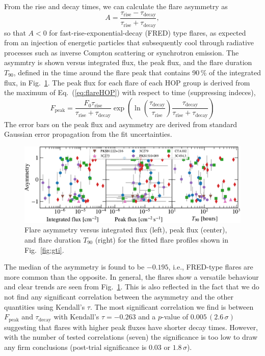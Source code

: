 \documentclass[twocolumn]{aastex62}
\begin{document}
From the rise and decay times, we can calculate the flare asymmetry as
\begin{equation}
    A = \frac{\tau_\mathrm{rise}-\tau_\mathrm{decay}}
    {\tau_\mathrm{rise}+\tau_\mathrm{decay}},
\end{equation}
so that $A < 0$ for fast-rise-exponential-decay (FRED) type flares, as expected from an injection of energetic particles that subsequently cool through radiative processes such as inverse Compton scattering or synchrotron emission.
The asymmtry is shown versus integrated flux, the peak flux, and the flare duration $T_{90}$, defined in the time around the flare peak that contains 90\,\% of the integrated flux, in Fig.~\ref{fig:asym}.
The peak flux for each flare of each HOP group is derived from the maximum of  Eq.~(\ref{eq:flareHOP}) with respect to time (suppressing indeces),
\begin{equation}
    F_{\mathrm{peak}} = \frac{F_{0} \tau_\mathrm{rise}}{\tau_\mathrm{rise} + \tau_\mathrm{decay}}\exp\left(\ln\left(\frac{\tau_\mathrm{decay}}{\tau_\mathrm{rise}}\right)\frac{\tau_\mathrm{decay}}{\tau_\mathrm{rise} + \tau_\mathrm{decay}}\right)
\end{equation}
The error bars on the peak flux and asymmetry are derived from standard Gaussian error propagation from the fit uncertainties.
\begin{figure}
    \centering
    \includegraphics[width = .8\linewidth]{figures/lcfithop_results_asym_vs_all_orbit_maxiter2_fsys0p00_addcomp0.pdf}
    \caption{Flare asymmetry versus integrated flux (left), peak flux (center), and flare duration $T_{90}$ (right) for the fitted flare profiles shown in Fig.~\ref{fig:gti}.}
    \label{fig:asym}
\end{figure}

The median of the asymmetry is found to be $-0.195$, i.e., FRED-type flares are more common than the opposite. In general, the flares show a versatile behaviour and clear trends are seen from Fig.~\ref{fig:asym}. This is also reflected in the fact that we do not find any significant correlation between the asymmetry and the other quantities using Kendall's $\tau$.
The most significant correlation we find is between $F_\mathrm{peak}$ and $\tau_\mathrm{decay}$ with Kendall's $\tau = -0.263$ and a $p$-value of $0.005\,(2.6\,\sigma)$ suggesting that flares with higher peak fluxes have shorter decay times. However, with the number of tested correlations (seven) the significance is too low to draw any firm conclusions (post-trial significance is 0.03 or $1.8\,\sigma$). 
\end{document}
